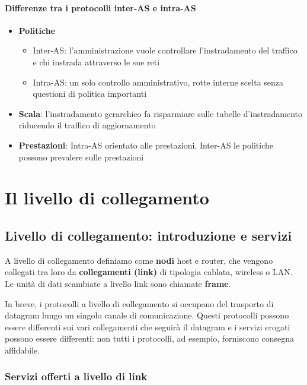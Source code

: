 \documentclass{report}
\begin{document}
\hypertarget{header-n349}{%
\subsubsection{Differenze tra i protocolli inter-AS e
intra-AS}\label{header-n349}}

\begin{itemize}
\item
  \textbf{Politiche}

  \begin{itemize}
  \item
    Inter-AS: l'amministrazione vuole controllare l'instradamento del
    traffico e chi instrada attraverso le sue reti
  \item
    Intra-AS: un solo controllo amministrativo, rotte interne scelta
    senza questioni di politica importanti
  \end{itemize}
\item
  \textbf{Scala}: l'instradamento gerarchico fa risparmiare sulle
  tabelle d'instradamento riducendo il traffico di aggiornamento
\item
  \textbf{Prestazioni}: Intra-AS orientato alle prestazioni, Inter-AS le
  politiche possono prevalere sulle prestazioni
\end{itemize}
	
	\chapter{Il livello di collegamento}
	
	\hypertarget{header-n0}{%
\section{Livello di collegamento: introduzione e
servizi}\label{header-n0}}

A livello di collegamento definiamo come \textbf{nodi} host e router,
che vengono collegati tra loro da \textbf{collegamenti (link)} di
tipologia cablata, wireless o LAN. Le unità di dati scambiate a livello
link sono chiamate \textbf{frame}.

In breve, i protocolli a livello di collegamento si occupano del
trasporto di datagram lungo un singolo canale di comunicazione. Questi
protocolli possono essere differenti sui vari collegamenti che seguirà
il datagram e i servizi erogati possono essere differenti: non tutti i
protocolli, ad esempio, forniscono consegna affidabile.
\hypertarget{header-n4}{%
\subsection{Servizi offerti a livello di link}\label{header-n4}}
\end{document}
